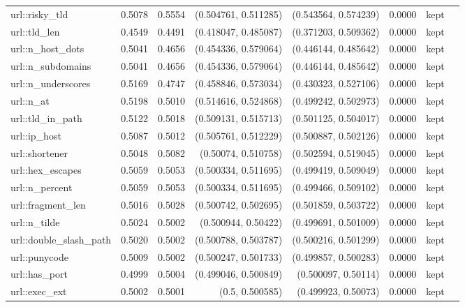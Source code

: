 \begin{table}[t]
\begin{tabular}{llrrrrrr}
url::risky\_tld & 0.5078 & 0.5554 & (0.504761, 0.511285) & (0.543564, 0.574239) & 0.0000 & kept &  \\
url::tld\_len & 0.4549 & 0.4491 & (0.418047, 0.485087) & (0.371203, 0.509362) & 0.0000 & kept &  \\
url::n\_host\_dots & 0.5041 & 0.4656 & (0.454336, 0.579064) & (0.446144, 0.485642) & 0.0000 & kept &  \\
url::n\_subdomains & 0.5041 & 0.4656 & (0.454336, 0.579064) & (0.446144, 0.485642) & 0.0000 & kept &  \\
url::n\_underscores & 0.5169 & 0.4747 & (0.458846, 0.573034) & (0.430323, 0.527106) & 0.0000 & kept &  \\
url::n\_at & 0.5198 & 0.5010 & (0.514616, 0.524868) & (0.499242, 0.502973) & 0.0000 & kept &  \\
url::tld\_in\_path & 0.5122 & 0.5018 & (0.509131, 0.515713) & (0.501125, 0.504017) & 0.0000 & kept &  \\
url::ip\_host & 0.5087 & 0.5012 & (0.505761, 0.512229) & (0.500887, 0.502126) & 0.0000 & kept &  \\
url::shortener & 0.5048 & 0.5082 & (0.50074, 0.510758) & (0.502594, 0.519045) & 0.0000 & kept &  \\
url::hex\_escapes & 0.5059 & 0.5053 & (0.500334, 0.511695) & (0.499419, 0.509049) & 0.0000 & kept &  \\
url::n\_percent & 0.5059 & 0.5053 & (0.500334, 0.511695) & (0.499466, 0.509102) & 0.0000 & kept &  \\
url::fragment\_len & 0.5016 & 0.5028 & (0.500742, 0.502695) & (0.501859, 0.503722) & 0.0000 & kept &  \\
url::n\_tilde & 0.5024 & 0.5002 & (0.500944, 0.50422) & (0.499691, 0.501009) & 0.0000 & kept &  \\
url::double\_slash\_path & 0.5020 & 0.5002 & (0.500788, 0.503787) & (0.500216, 0.501299) & 0.0000 & kept &  \\
url::punycode & 0.5009 & 0.5002 & (0.500247, 0.501733) & (0.499857, 0.500283) & 0.0000 & kept &  \\
url::has\_port & 0.4999 & 0.5004 & (0.499046, 0.500849) & (0.500097, 0.50114) & 0.0000 & kept &  \\
url::exec\_ext & 0.5002 & 0.5001 & (0.5, 0.500585) & (0.499923, 0.50073) & 0.0000 & kept &  \\
\bottomrule
\end{tabular}
\end{table}